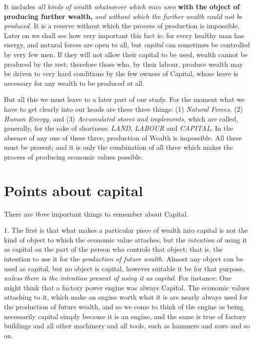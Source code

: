 \documentclass{book}
\begin{document}
It includes \emph{all kinds of wealth whatsoever which man uses} \textbf{with the object of producing further wealth,} \emph{and without which the further wealth could not be produced.} It is a reserve without which the process of production is impossible. Later on we shall see how very important this fact is: for every healthy man has energy, and natural forces are open to all, but \emph{capital} can sometimes be controlled by very few men. If they will not allow their capital to be used, wealth cannot be produced by the rest; therefore those who, by their labour, produce wealth may be driven to very hard conditions by the few owners of Capital, whose leave is necessary for any wealth to be produced at all.

But all this we must leave to a later part of our study. For the moment what we have to get clearly into our heads are these three things: (1) \emph{Natural Forces,} (2) \emph{Human Energy,} and (3) \emph{Accumulated stores and implements,} which are called, generally, for the sake of shortness: \emph{LAND}, \emph{LABOUR} and \emph{CAPITAL}. In the absence of any one of these three, production of Wealth is impossible. All three must be present; and it is only the combination of all three which makes the process of producing economic values possible.

\section{Points about capital}
There are \emph{three} important things to remember about Capital.

1. The first is that what makes a particular piece of wealth into capital is not the kind of object to which the economic value attaches, but the \emph{intention} of using it as capital on the part of the person who controls that object; that is, the intention to use it for the \emph{production of future wealth.} Almost any object can be used as capital, but no object is capital, however suitable it be for that purpose, \emph{unless there is the intention present of using it as capital.} For instance: One might think that a factory power engine was always Capital. The economic values attaching to it, which make an engine worth what it is are nearly always used for the production of future wealth, and so we come to think of the engine as being necessarily capital simply because it is an engine, and the same is true of factory buildings and all other machinery and all tools, such as hammers and saws and so on.
\end{document}
